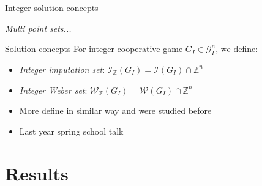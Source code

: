 \documentclass{beamer}
\newcommand{\Z}{\mathbb{Z}}
\begin{document}


\begin{frame}{Integer solution concepts}

    \textit{Multi point sets...}


    \begin{block}{Solution concepts}
        For integer cooperative game $G_I \in \mathcal{G}_I^n$, we define:
        \begin{itemize}
            \item \emph{Integer imputation set}: $\mathcal{I}_{\Z}(G_I) = \mathcal{I}(G_I) \cap \Z^{n}$
            \item \emph{Integer Weber set}: $\mathcal{W}_{\Z}(G_I) = \mathcal{W}(G_I) \cap \Z^{n}$
        \end{itemize}
    \end{block}

    \begin{itemize}
        \item More define in similar way and were studied before
        \item Last year spring school talk
    \end{itemize}

\end{frame}




\section{Results}

\end{document}
